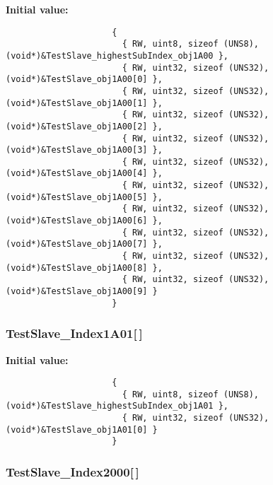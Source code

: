 \textbf{Initial value:}

\begin{Code}\begin{verbatim} 
                     {
                       { RW, uint8, sizeof (UNS8), (void*)&TestSlave_highestSubIndex_obj1A00 },
                       { RW, uint32, sizeof (UNS32), (void*)&TestSlave_obj1A00[0] },
                       { RW, uint32, sizeof (UNS32), (void*)&TestSlave_obj1A00[1] },
                       { RW, uint32, sizeof (UNS32), (void*)&TestSlave_obj1A00[2] },
                       { RW, uint32, sizeof (UNS32), (void*)&TestSlave_obj1A00[3] },
                       { RW, uint32, sizeof (UNS32), (void*)&TestSlave_obj1A00[4] },
                       { RW, uint32, sizeof (UNS32), (void*)&TestSlave_obj1A00[5] },
                       { RW, uint32, sizeof (UNS32), (void*)&TestSlave_obj1A00[6] },
                       { RW, uint32, sizeof (UNS32), (void*)&TestSlave_obj1A00[7] },
                       { RW, uint32, sizeof (UNS32), (void*)&TestSlave_obj1A00[8] },
                       { RW, uint32, sizeof (UNS32), (void*)&TestSlave_obj1A00[9] }
                     }
\end{verbatim}\end{Code}
\subsubsection{ {\bf Test\-Slave\_\-Index1A01}[$\,$]}\label{TestSlave_8c_189f0c55631896c84e1f213bda1e65cc}


\textbf{Initial value:}

\begin{Code}\begin{verbatim} 
                     {
                       { RW, uint8, sizeof (UNS8), (void*)&TestSlave_highestSubIndex_obj1A01 },
                       { RW, uint32, sizeof (UNS32), (void*)&TestSlave_obj1A01[0] }
                     }
\end{verbatim}\end{Code}
\subsubsection{ {\bf Test\-Slave\_\-Index2000}[$\,$]}\label{TestSlave_8c_f6d50fd3fe38ccfd3d555a74c772dc42}


